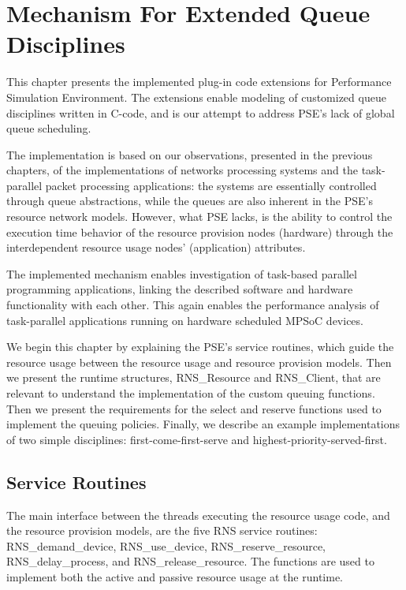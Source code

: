\chapter{Mechanism For Extended Queue Disciplines}
\label{chapter:mechanism-for-extended-queue-disciplines}

This chapter presents the implemented plug-in code extensions for Performance Simulation Environment. The extensions enable modeling of customized queue disciplines written in C-code, and is our attempt to address PSE's lack of global queue scheduling.

The implementation is based on our observations, presented in the previous chapters, of the implementations of networks processing systems and the task-parallel packet processing applications: the systems are essentially controlled through queue abstractions, while the queues are also inherent in the PSE's resource network models. However, what PSE lacks, is the ability to control the execution time behavior of the resource provision nodes (hardware) through the interdependent resource usage nodes' (application) attributes.

The implemented mechanism enables investigation of task-based parallel programming applications, linking the described software and hardware functionality with each other. This again enables the performance analysis of task-parallel applications running on hardware scheduled MPSoC devices.

We begin this chapter by explaining the PSE's service routines, which guide the resource usage between the resource usage and resource provision models. Then we present the runtime structures, RNS\_Resource and RNS\_Client, that are relevant to understand the implementation of the custom queuing functions. Then we present the requirements for the select and reserve functions used to implement the queuing policies. Finally, we describe an example implementations of two simple disciplines: first-come-first-serve and highest-priority-served-first.

\section{Service Routines}
The main interface between the threads executing the resource usage code, and the resource provision models, are the five RNS service routines: RNS\_demand\_device, RNS\_use\_device, RNS\_reserve\_resource, RNS\_delay\_process, and RNS\_release\_resource. The functions are used to implement both the active and passive resource usage at the runtime.

